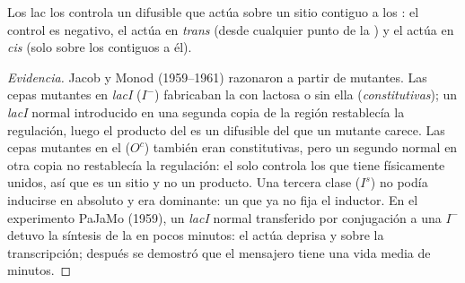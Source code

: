 \begin{proposition}\label{prop:b1:expression-control:jacobmonod}
Los  lac los controla un  difusible que actúa sobre un sitio
contiguo a los : el control es negativo, el  actúa en
\emph{trans} (desde cualquier punto de la ) y el  actúa en
\emph{cis} (solo sobre los  contiguos a él).
\end{proposition}
\begin{proof}[Evidencia]
Jacob y Monod (1959--1961) razonaron a partir de mutantes. Las cepas mutantes
en \emph{lacI} ($I^-$) fabricaban la  con lactosa o sin ella
(\emph{constitutivas}); un  \emph{lacI} normal introducido en una segunda
copia de la región restablecía la regulación, luego el producto del  es
un  difusible del que un mutante carece. Las cepas mutantes en el
 ($O^c$) también eran constitutivas, pero un segundo  normal
en otra copia no restablecía la regulación: el  solo controla los
 que tiene físicamente unidos, así que es un sitio y no un producto.
Una tercera clase ($I^s$) no podía inducirse en absoluto y era dominante: un
 que ya no fija el inductor. En el experimento PaJaMo (1959), un 
\emph{lacI} normal transferido por conjugación a una  $I^-$ detuvo la
síntesis de la  en pocos minutos: el  actúa deprisa y sobre la
transcripción; después se demostró que el mensajero tiene una vida media de
minutos.
\end{proof}

